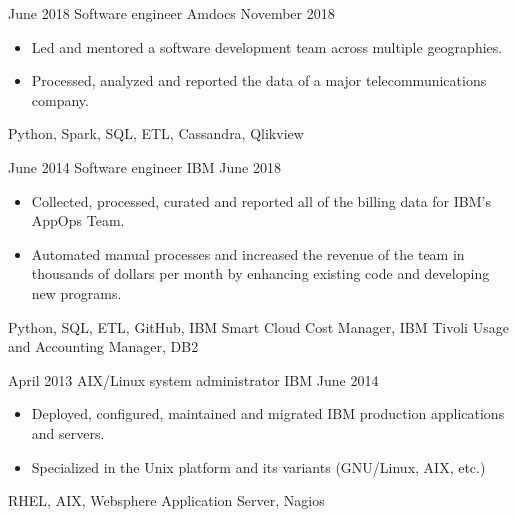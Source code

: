 \begin{experiences}
    \emptySeparator

    \experience
        {June 2018}
        {Software engineer}
        {Amdocs}
        {November 2018}
        {
            \begin{itemize}
                \item Led and mentored a software development team 
                    across multiple geographies.
                \item Processed, analyzed and reported 
                    the data of a major telecommunications company.
            \end{itemize}
        }
        {
            Python,
            Spark,
            SQL,
            ETL,
            Cassandra,
            Qlikview
        }

    \emptySeparator

    \experience
        {June 2014}
        {Software engineer}
        {IBM}
        {June 2018}
        {
            \begin{itemize}
                \item Collected, processed, curated and reported all of the 
                    billing data for IBM's AppOps Team.
                \item Automated manual processes and increased the revenue of the 
                    team in thousands of dollars per month by enhancing 
                    existing code and developing new programs.
            \end{itemize}
        }
        {
            Python,
            SQL,
            ETL,
            GitHub,
            IBM Smart Cloud Cost Manager,
            IBM Tivoli Usage and Accounting Manager,
            DB2
        }

    \emptySeparator

    \experience
        {April 2013}
        {AIX/Linux system administrator}
        {IBM}
        {June 2014}
        {
            \begin{itemize}
                \item Deployed, configured, maintained and migrated
                    IBM production applications and servers. 
                \item Specialized in the Unix platform and its variants 
                    (GNU/Linux, AIX, etc.)
            \end{itemize}
        }
        {
            RHEL,
            AIX,
            Websphere Application Server,
            Nagios
        }


\end{experiences}
